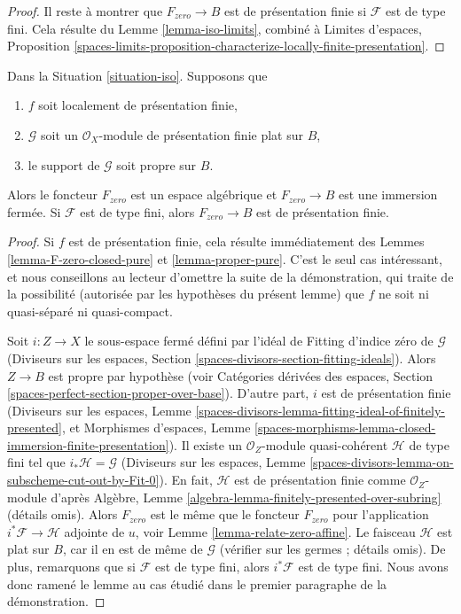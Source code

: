 \begin{proof}
\medskip\noindent
Il reste à montrer que $F_{zero} \to B$ est de présentation finie si
$\mathcal{F}$ est de type fini. Cela résulte du
Lemme \ref{lemma-iso-limits}, combiné à
Limites d'espaces, Proposition
\ref{spaces-limits-proposition-characterize-locally-finite-presentation}.
\end{proof}

\begin{lemma}
\label{lemma-F-zero-closed-proper}
Dans la Situation \ref{situation-iso}. Supposons que
\begin{enumerate}
\item $f$ soit localement de présentation finie,
\item $\mathcal{G}$ soit un $\mathcal{O}_X$-module de présentation finie
plat sur $B$,
\item le support de $\mathcal{G}$ soit propre sur $B$.
\end{enumerate}
Alors le foncteur $F_{zero}$ est un espace algébrique et $F_{zero} \to B$
est une immersion fermée. Si $\mathcal{F}$ est de type fini, alors
$F_{zero} \to B$ est de présentation finie.
\end{lemma}

\begin{proof}
Si $f$ est de présentation finie, cela résulte immédiatement des
Lemmes \ref{lemma-F-zero-closed-pure} et \ref{lemma-proper-pure}.
C'est le seul cas intéressant, et nous conseillons au lecteur d'omettre
la suite de la démonstration, qui traite de la possibilité (autorisée
par les hypothèses du présent lemme)
que $f$ ne soit ni quasi-séparé ni quasi-compact.

\medskip\noindent
Soit $i : Z \to X$ le sous-espace fermé défini par l'idéal de Fitting
d'indice zéro de $\mathcal{G}$
(Diviseurs sur les espaces, Section
\ref{spaces-divisors-section-fitting-ideals}).
Alors $Z \to B$ est propre par hypothèse (voir
Catégories dérivées des espaces, Section
\ref{spaces-perfect-section-proper-over-base}).
D'autre part, $i$ est de présentation finie
(Diviseurs sur les espaces, Lemme
\ref{spaces-divisors-lemma-fitting-ideal-of-finitely-presented}, et
Morphismes d'espaces, Lemme
\ref{spaces-morphisms-lemma-closed-immersion-finite-presentation}).
Il existe un $\mathcal{O}_Z$-module quasi-cohérent
$\mathcal{H}$ de type fini tel que $i_*\mathcal{H} = \mathcal{G}$
(Diviseurs sur les espaces, Lemme
\ref{spaces-divisors-lemma-on-subscheme-cut-out-by-Fit-0}).
En fait, $\mathcal{H}$ est de présentation finie comme $\mathcal{O}_Z$-module
d'après Algèbre, Lemme \ref{algebra-lemma-finitely-presented-over-subring}
(détails omis).
Alors $F_{zero}$ est le même que le foncteur $F_{zero}$
pour l'application $i^*\mathcal{F} \to \mathcal{H}$ adjointe de $u$, voir
Lemme \ref{lemma-relate-zero-affine}.
Le faisceau $\mathcal{H}$ est plat sur $B$, car
il en est de même de $\mathcal{G}$ (vérifier sur les germes ; détails omis).
De plus, remarquons que si $\mathcal{F}$ est de type fini,
alors $i^*\mathcal{F}$ est de type fini.
Nous avons donc ramené le lemme au cas
étudié dans le premier paragraphe de la démonstration.
\end{proof}









